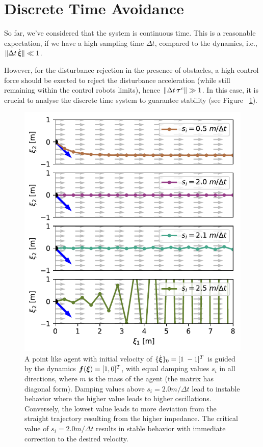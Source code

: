 \section{Discrete Time Avoidance}
So far, we've considered that the system is continuous time. 
This is a reasonable expectation, if we have a high sampling time $\Delta t$, compared to the dynamics, i.e., $\| \Delta t \, \dot{\boldsymbol{\xi}} \| \ll 1$.

However, for the disturbance rejection in the presence of obstacles, a high control force should be exerted to reject the disturbance acceleration (while still remaining within the control robots limits), hence $\| \Delta t \, \boldsymbol{\tau}^c \| \gg 1$. 
In this case, it is crucial to analyse the discrete time system to guarantee stability (see Figure~
\ref{fig:discrete_controller_parameters_comparison}).

\begin{figure}[htb]
\centering
  \includegraphics[width=\columnwidth]{figures/discrete_controller_parameters_comparison}
  \caption{A point like agent with initial velocity of $\{ \dot{\boldsymbol{\xi}} \}_0 = [1 \; -1]^T$ is guided by the dynamics $\boldsymbol{f}(\boldsymbol{\xi}) = [1, 0]^T$, with equal damping values $s_i$ in all directions, where $m$ is the mass of the agent (the matrix has diagonal form). 
  Damping values above $s_i = 2.0 m / \Delta t$ lead to instable behavior where the higher value leads to higher oscillations. Conversely, the lowest value leads to more deviation from the straight trajectory resulting from the higher impedance. The critical value of $s_i = 2.0 m / \Delta t$ results in stable behavior with immediate correction to the desired velocity.}
  \label{fig:discrete_controller_parameters_comparison}
\end{figure}

